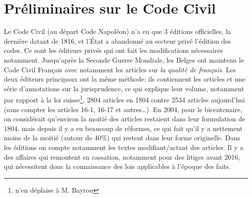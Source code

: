 \documentclass[math]{cours}
\begin{document}
\section{Préliminaires sur le Code Civil}
Le Code Civil (au départ Code Napoléon) n'a eu que 3 éditions officielles, la dernière datant de 1816, et l'État a abandonné au secteur privé l'édition des codes.
Ce sont les éditeurs privés qui ont fait les modifications nécessaires notamment.
Jusqu'après la Seconde Guerre Mondiale, les Belges ont maintenu le Code Civil Français avec notamment les articles sur \emph{la qualité de français}.
Les deux éditeurs principaux ont la même méthode: ils contiennent les articles et une série d'annotations sur la jurisprudence, ce qui explique leur volume, notamment par rapport à la loi suisse\footnote{n'en déplaise à M. Bayrou}.
2804 articles en 1804 contre 2534 articles aujourd'hui (sans compter les articles 16-1, 16-17 et autres\ldots).
En 2004, pour le bicentenaire, on considérait qu'environ la moitié des articles restaient dans leur formulation de 1804, mais depuis il y a eu beaucoup de réformes, ce qui fait qu'il y a nettement moins de la moitié (autour de 40\%) qui restent dans leur forme originelle.
Dans les éditions on compte notamment les textes modifiant/actant des articles.
Il y a des affaires qui remontent en cassation, notamment pour des litiges avant 2016, qui nécessitent donc la connaissance des lois applicables à l'époque des faits.
\end{document}
